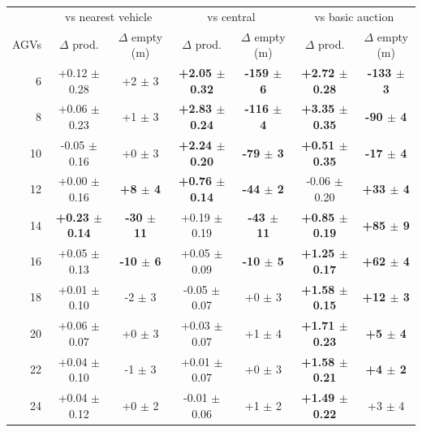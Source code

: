 \begin{tabular}{rcccccc}
\toprule
& \multicolumn{2}{c}{vs nearest vehicle} & \multicolumn{2}{c}{vs central} & \multicolumn{2}{c}{vs basic auction} \\
AGVs & $\Delta$ prod. & $\Delta$ empty (m) & $\Delta$ prod. & $\Delta$ empty (m) & $\Delta$ prod. & $\Delta$ empty (m) \\
\midrule
6 & +0.12 $\pm$ 0.28 & +2 $\pm$ 3 & \textbf{+2.05 $\pm$ 0.32} & \textbf{-159 $\pm$ 6} & \textbf{+2.72 $\pm$ 0.28} & \textbf{-133 $\pm$ 3} \\
8 & +0.06 $\pm$ 0.23 & +1 $\pm$ 3 & \textbf{+2.83 $\pm$ 0.24} & \textbf{-116 $\pm$ 4} & \textbf{+3.35 $\pm$ 0.35} & \textbf{-90 $\pm$ 4} \\
10 & -0.05 $\pm$ 0.16 & +0 $\pm$ 3 & \textbf{+2.24 $\pm$ 0.20} & \textbf{-79 $\pm$ 3} & \textbf{+0.51 $\pm$ 0.35} & \textbf{-17 $\pm$ 4} \\
12 & +0.00 $\pm$ 0.16 & \textbf{+8 $\pm$ 4} & \textbf{+0.76 $\pm$ 0.14} & \textbf{-44 $\pm$ 2} & -0.06 $\pm$ 0.20 & \textbf{+33 $\pm$ 4} \\
14 & \textbf{+0.23 $\pm$ 0.14} & \textbf{-30 $\pm$ 11} & +0.19 $\pm$ 0.19 & \textbf{-43 $\pm$ 11} & \textbf{+0.85 $\pm$ 0.19} & \textbf{+85 $\pm$ 9} \\
16 & +0.05 $\pm$ 0.13 & \textbf{-10 $\pm$ 6} & +0.05 $\pm$ 0.09 & \textbf{-10 $\pm$ 5} & \textbf{+1.25 $\pm$ 0.17} & \textbf{+62 $\pm$ 4} \\
18 & +0.01 $\pm$ 0.10 & -2 $\pm$ 3 & -0.05 $\pm$ 0.07 & +0 $\pm$ 3 & \textbf{+1.58 $\pm$ 0.15} & \textbf{+12 $\pm$ 3} \\
20 & +0.06 $\pm$ 0.07 & +0 $\pm$ 3 & +0.03 $\pm$ 0.07 & +1 $\pm$ 4 & \textbf{+1.71 $\pm$ 0.23} & \textbf{+5 $\pm$ 4} \\
22 & +0.04 $\pm$ 0.10 & -1 $\pm$ 3 & +0.01 $\pm$ 0.07 & +0 $\pm$ 3 & \textbf{+1.58 $\pm$ 0.21} & \textbf{+4 $\pm$ 2} \\
24 & +0.04 $\pm$ 0.12 & +0 $\pm$ 2 & -0.01 $\pm$ 0.06 & +1 $\pm$ 2 & \textbf{+1.49 $\pm$ 0.22} & +3 $\pm$ 4 \\
\bottomrule
\end{tabular}
